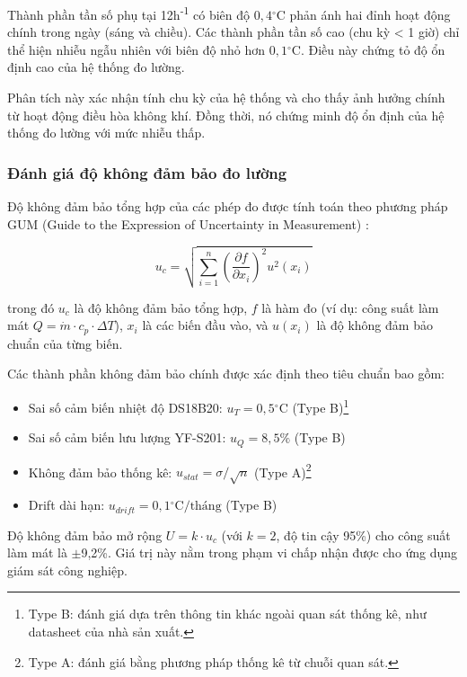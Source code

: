 \documentclass[../main.tex]{subfiles}
\begin{document}
Thành phần tần số phụ tại 12h\textsuperscript{-1} có biên độ $0,4{^\circ\mathrm{C}}$ phản ánh hai đỉnh hoạt động chính trong ngày (sáng và chiều). Các thành phần tần số cao (chu kỳ < 1 giờ) chỉ thể hiện nhiễu ngẫu nhiên với biên độ nhỏ hơn $0,1{^\circ\mathrm{C}}$. Điều này chứng tỏ độ ổn định cao của hệ thống đo lường.

Phân tích này xác nhận tính chu kỳ của hệ thống và cho thấy ảnh hưởng chính từ hoạt động điều hòa không khí. Đồng thời, nó chứng minh độ ổn định của hệ thống đo lường với mức nhiễu thấp.

\subsubsection{Đánh giá độ không đảm bảo đo lường}
\label{sec:measurement_uncertainty}

Độ không đảm bảo tổng hợp của các phép đo được tính toán theo phương pháp GUM (Guide to the Expression of Uncertainty in Measurement) \cite{JCGM100:2008}:

\begin{equation}
u_c = \sqrt{\sum_{i=1}^{n} \left(\frac{\partial f}{\partial x_i}\right)^2 u^2(x_i)}
\end{equation}

\noindent trong đó $u_c$ là độ không đảm bảo tổng hợp, $f$ là hàm đo (ví dụ: công suất làm mát $Q = \dot{m} \cdot c_p \cdot \Delta T$), $x_i$ là các biến đầu vào, và $u(x_i)$ là độ không đảm bảo chuẩn của từng biến.

Các thành phần không đảm bảo chính được xác định theo tiêu chuẩn \cite{JCGM100:2008} bao gồm:
\begin{itemize}
\item Sai số cảm biến nhiệt độ DS18B20: $u_T = 0,5{^\circ\mathrm{C}}$ (Type B)\footnote{Type B: đánh giá dựa trên thông tin khác ngoài quan sát thống kê, như datasheet của nhà sản xuất.}
\item Sai số cảm biến lưu lượng YF-S201: $u_Q = 8,5\%$ (Type B)
\item Không đảm bảo thống kê: $u_{stat} = \sigma/\sqrt{n}$ (Type A)\footnote{Type A: đánh giá bằng phương pháp thống kê từ chuỗi quan sát.}
\item Drift dài hạn: $u_{drift} = 0,1{^\circ\mathrm{C}}/\text{tháng}$ (Type B)
\end{itemize}

Độ không đảm bảo mở rộng $U = k \cdot u_c$ (với $k=2$, độ tin cậy 95\%) cho công suất làm mát là $\pm$9,2\%. Giá trị này nằm trong phạm vi chấp nhận được cho ứng dụng giám sát công nghiệp.
\end{document}
